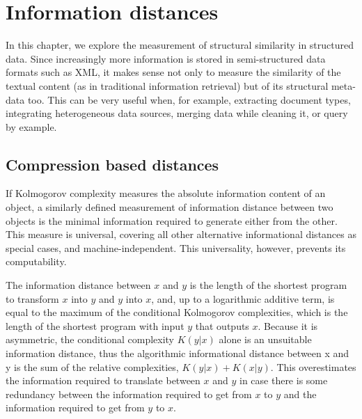 \chapter{Information distances}\label{ch:information_distances}
%
In this chapter, we explore the measurement of structural similarity in structured data.  Since increasingly more information is stored in semi-structured data formats such as XML, it makes sense not only to measure the similarity of the textual content (as in traditional information retrieval) but of its structural meta-data too. This can be very useful when, for example, extracting document types, integrating heterogeneous data sources, merging data while cleaning it, or query by example.
\section{Compression based distances}
If Kolmogorov complexity measures the absolute information content of an object, a similarly defined measurement of information distance between two objects is the minimal information required to generate either from the other.  This measure is universal, covering all other alternative informational distances as special cases, and machine-independent.  This universality, however, prevents its computability.\cite{}

The information distance between $x$ and $y$ is the length of the shortest program to transform $x$ into $y$ and $y$ into $x$, and, up to a logarithmic additive term, is equal to the maximum of the conditional Kolmogorov complexities, which is the length of the shortest program with input $y$ that outputs $x$\cite{}.  Because it is asymmetric, the conditional complexity $K(y|x)$ alone is an unsuitable information distance, thus the algorithmic informational distance between x and y is the sum of the relative complexities, $K(y|x)+ K(x|y)$. This overestimates the information required to translate between $x$ and $y$ in case there is some redundancy between the information required to get from $x$ to $y$ and the information required to get from $y$ to $x$.

